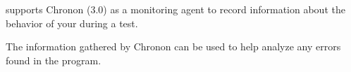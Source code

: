 \app{} supports Chronon (3.0) as a monitoring agent to record information about the behavior of your \gdaut{} during a test. 

The information gathered by Chronon can be used to help analyze any errors found in the program. 

